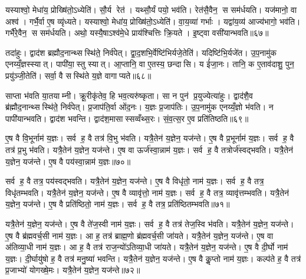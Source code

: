यस्याश्वो॒ मेधा॑य॒ प्रोख्षि॑तो॒ऽध्येति॑। सौ॒र्य रेत॑। यथ्सौ॒र्यं पयो॒ भव॑ति। रेत॑सै॒वैन॒ स सम॑र्धयति। यज॑मानो॒ वा अश्व॑। गर्भै॒र्वा ए॒ष व्यृ॑ध्यते। यस्याश्वो॒ मेधा॑य॒ प्रोख्षि॑तो॒ऽध्येति॑। वा॒य॒व्या॑ गर्भाः। यद्वा॑य॒व्य॑ आज्य॑भागो॒ भव॑ति। गर्भै॑रे॒वैन॒ स सम॑र्धयति। अथो॒ यस्यै॒षाऽश्व॑मे॒धे प्राय॑श्चित्तिः क्रि॒यते। इ॒ष्ट्वा वसी॑यान्भवति॥६७॥\anuvakamend[वि॒न्दत्यश्लो॑णो है॒व भ॑वत्यधी॒यादृ॑ध्यते॒ गर्भै॑रे॒वैन॒ स सम॑र्धयति॒ द्वे च॑]

तदा॑हुः। द्वाद॑श ब्रह्मौद॒नान्थ्सस्थि॑ते॒ निर्व॑पेत्। द्वा॒द॒शभि॒र्वेष्टि॑भिर्यजे॒तेति॑। यदिष्टि॑भि॒र्यजे॑त। उ॒प॒नामु॑क एनय्यँ॒ज्ञस्स्यात्। पापी॑या॒स्तु स्यात्। आ॒प्तानि॒ वा ए॒तस्य॒ छन्दासि। य ई॑जा॒नः। तानि॒ क ए॒ताव॑दाशु॒ पुन॒ प्रयु॑ञ्जी॒तेति॑। सर्वा॒ वै सस्थि॑ते य॒ज्ञे वागाप्यते॥६८॥

साप्ता भ॑वति या॒तयाम्नी। क्रू॒रीकृ॑तेव॒ हि भव॒त्यरु॑ष्कृता। सा न पुन॑ प्र॒युज्येत्या॑हुः। द्वाद॑शै॒व ब्र॑ह्मौद॒नान्थ्सस्थि॑ते॒ निर्व॑पेत्। प्र॒जाप॑ति॒र्वा ओ॑द॒नः। य॒ज्ञः प्र॒जाप॑तिः। उ॒प॒नामु॑क एनय्यँ॒ज्ञो भ॑वति। न पापी॑यान्भवति। द्वाद॑श भवन्ति। द्वाद॑श॒मासास्सव्वँथ्स॒रः। सं॒व॒त्स॒र ए॒व प्रति॑तिष्ठति॥६९॥\anuvakamend[आ॒प्य॒ते॒ सं॒व॒त्स॒र एक॑ञ्च]

ए॒ष वै वि॒भूर्नाम॑ य॒ज्ञः। सर्व ह॒ वै तत्र॑ वि॒भु भ॑वति। यत्रै॒तेन॑ य॒ज्ञेन॒ यज॑न्ते। ए॒ष वै प्र॒भूर्नाम॑ य॒ज्ञः। सर्व ह॒ वै तत्र॑ प्र॒भु भ॑वति। यत्रै॒तेन॑ य॒ज्ञेन॒ यज॑न्ते। ए॒ष वा ऊर्ज॑स्वा॒न्नाम॑ य॒ज्ञः। सर्व ह॒ वै तत्रोर्ज॑स्वद्भवति। यत्रै॒तेन॑ य॒ज्ञेन॒ यज॑न्ते। ए॒ष वै पय॑स्वा॒न्नाम॑ य॒ज्ञः॥७०॥

सर्व ह॒ वै तत्र॒ पय॑स्वद्भवति। यत्रै॒तेन॑ य॒ज्ञेन॒ यज॑न्ते। ए॒ष वै विधृ॑तो॒ नाम॑ य॒ज्ञः। सर्व ह॒ वै तत्र॒ विधृ॑तम्भवति। यत्रै॒तेन॑ य॒ज्ञेन॒ यज॑न्ते। ए॒ष वै व्यावृ॑त्तो॒ नाम॑ य॒ज्ञः। सर्व ह॒ वै तत्र॒ व्यावृ॑त्तम्भवति। यत्रै॒तेन॑ य॒ज्ञेन॒ यज॑न्ते। ए॒ष वै प्रति॑ष्ठितो॒ नाम॑ य॒ज्ञः। सर्व ह॒ वै तत्र॒ प्रति॑ष्ठितम्भवति॥७१॥

यत्रै॒तेन॑ य॒ज्ञेन॒ यज॑न्ते। ए॒ष वै ते॑ज॒स्वी नाम॑ य॒ज्ञः। सर्व ह॒ वै तत्र॑ तेज॒स्वि भ॑वति। यत्रै॒तेन॑ य॒ज्ञेन॒ यज॑न्ते। ए॒ष वै ब्र॑ह्मवर्च॒सी नाम॑ य॒ज्ञः। आ ह॒ तत्र॑ ब्राह्म॒णो ब्र॑ह्मवर्च॒सी जा॑यते। यत्रै॒तेन॑ य॒ज्ञेन॒ यज॑न्ते। ए॒ष वा अ॑तिव्या॒धी नाम॑ य॒ज्ञः। आ ह॒ वै तत्र॑ राज॒न्यो॑ऽतिव्या॒धी जा॑यते। यत्रै॒तेन॑ य॒ज्ञेन॒ यज॑न्ते। ए॒ष वै दी॒र्घो नाम॑ य॒ज्ञः। दी॒र्घायु॑षो ह॒ वै तत्र॑ मनु॒ष्या॑ भवन्ति। यत्रै॒तेन॑ य॒ज्ञेन॒ यज॑न्ते। ए॒ष वै कॢ॒प्तो नाम॑ य॒ज्ञः। कल्प॑ते ह॒ वै तत्र॑ प्र॒जाभ्यो॑ योगख्षे॒मः। यत्रै॒तेन॑ य॒ज्ञेन॒ यज॑न्ते॥७२॥

